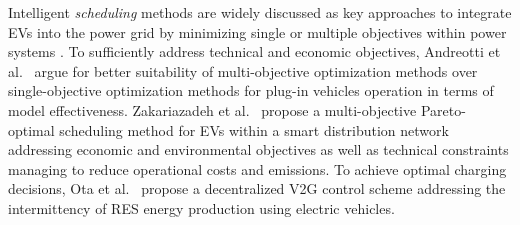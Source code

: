 %


Intelligent \textit{scheduling} methods are widely discussed as key approaches to integrate EVs into the power grid by minimizing single or multiple objectives within power systems \cite{yang2015computational}.
To sufficiently address technical and economic objectives, Andreotti et al.~\cite{andreotti2012review} argue for better suitability of multi-objective optimization methods over single-objective optimization methods for plug-in vehicles operation in terms of model effectiveness.
Zakariazadeh et al.~\cite{zakariazadeh2014multi} propose a multi-objective Pareto-optimal scheduling method for EVs within a smart distribution network addressing economic and environmental objectives as well as technical constraints managing to reduce operational costs and emissions.
To achieve optimal charging decisions, Ota et al.~\cite{ota2012autonomous} propose a decentralized V2G control scheme addressing the intermittency of RES energy production using electric vehicles. 
